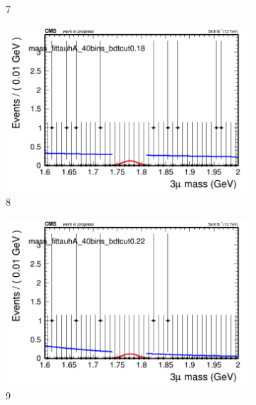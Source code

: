 \begin{figure}[h!]
\begin{subfigure}{0.2\textwidth}
        \caption{7}
    \end{subfigure}
    \begin{subfigure}{0.2\textwidth}
        \includegraphics[width=\textwidth]{unfixed_exp/plots/tauhA/massfit_tauhA_40bins_bdtcut0.18.png}
        \caption{8}
    \end{subfigure}
    \begin{subfigure}{0.2\textwidth}
        \includegraphics[width=\textwidth]{unfixed_exp/plots/tauhA/massfit_tauhA_40bins_bdtcut0.22.png}
        \caption{9}
    \end{subfigure}
    \begin{subfigure}{0.2\textwidth}

\end{subfigure}
\end{figure}

